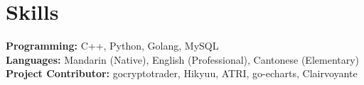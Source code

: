 \documentclass[letterpaper,11pt]{article}
\makeatletter
\newcommand{\resumeOrganizationHeading}[4]{
  \vspace{-2pt}\item
    \begin{tabular*}{0.97\textwidth}[t]{l@{\extracolsep{\fill}}r}
      \textbf{#1} & \textit{\small #2} \\
      \textit{\small#3}
    \end{tabular*}\vspace{-7pt}
}
\newcommand{\resumeSubHeadingListStart}{\begin{itemize}[leftmargin=0.15in, label={}]}
\newcommand{\resumeSubHeadingListEnd}{\end{itemize}}
\makeatother
\begin{document}

\section{Skills}
  \vspace{2pt}
  \resumeSubHeadingListStart
    \small{\item{
        \textbf{Programming:}{ C++, Python, Golang, MySQL} \\ \vspace{3pt}
        \textbf{Languages:}{ Mandarin (Native), English (Professional), Cantonese (Elementary)} \\ \vspace{3pt}
        \textbf{Project Contributor:}{ gocryptotrader, Hikyuu, ATRI, go-echarts, Clairvoyante} \\
    }}
  \resumeSubHeadingListEnd
























\end{document}
